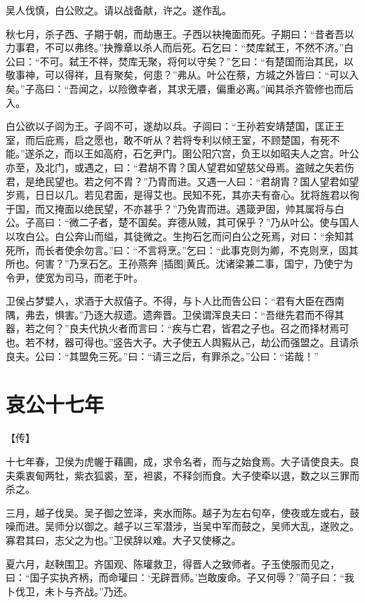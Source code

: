 \documentclass[a4paper,12pt,UTF8,twoside]{ctexbook}
\begin{document}
吴人伐慎，白公败之。请以战备献，许之。遂作乱。

秋七月，杀子西、子期于朝，而劫惠王。子西以袂掩面而死。子期曰：“昔者吾以力事君，不可以弗终。”抉豫章以杀人而后死。石乞曰：“焚库弑王，不然不济。”白公曰：“不可。弑王不祥，焚库无聚，将何以守矣？”乞曰：“有楚国而治其民，以敬事神，可以得祥，且有聚矣，何患？”弗从。叶公在蔡，方城之外皆曰：“可以入矣。”子高曰：“吾闻之，以险徼幸者，其求无餍，偏重必离。”闻其杀齐管修也而后入。

白公欲以子闾为王。子闾不可，遂劫以兵。子闾曰：“王孙若安靖楚国，匡正王室，而后庇焉，启之愿也，敢不听从？若将专利以倾王室，不顾楚国，有死不能。”遂杀之，而以王如高府，石乞尹门。圉公阳穴宫，负王以如昭夫人之宫。叶公亦至，及北门，或遇之，曰：“君胡不胄？国人望君如望慈父母焉。盗贼之矢若伤君，是绝民望也。若之何不胄？”乃胄而进。又遇一人曰：“君胡胄？国人望君如望岁焉，日日以几。若见君面，是得艾也。民知不死，其亦夫有奋心。犹将旌君以徇于国，而又掩面以绝民望，不亦甚乎？”乃免胄而进。遇箴尹固，帅其属将与白公。子高曰：“微二子者，楚不国矣。弃德从贼，其可保乎？”乃从叶公。使与国人以攻白公。白公奔山而缢，其徒微之。生拘石乞而问白公之死焉，对曰：“余知其死所，而长者使余勿言。”曰：“不言将烹。”乞曰：“此事克则为卿，不克则烹，固其所也。何害？”乃烹石乞。王孙燕奔 [插图]黄氏。沈诸梁兼二事，国宁，乃使宁为令尹，使宽为司马，而老于叶。

卫侯占梦嬖人，求酒于大叔僖子。不得，与卜人比而告公曰：“君有大臣在西南隅，弗去，惧害。”乃逐大叔遗。遗奔晋。卫侯谓浑良夫曰：“吾继先君而不得其器，若之何？”良夫代执火者而言曰：“疾与亡君，皆君之子也。召之而择材焉可也。若不材，器可得也。”竖告大子。大子使五人舆豭从己，劫公而强盟之。且请杀良夫。公曰：“其盟免三死。”曰：“请三之后，有罪杀之。”公曰：“诺哉！”


\section{哀公十七年}



【传】

十七年春，卫侯为虎幄于藉圃，成，求令名者，而与之始食焉。大子请使良夫。良夫乘衷甸两牡，紫衣狐裘，至，袒裘，不释剑而食。大子使牵以退，数之以三罪而杀之。

三月，越子伐吴。吴子御之笠泽，夹水而陈。越子为左右句卒，使夜或左或右，鼓噪而进。吴师分以御之。越子以三军潜涉，当吴中军而鼓之，吴师大乱，遂败之。寡君其曰，志父之为也。”卫侯辞以难。大子又使椓之。

夏六月，赵鞅围卫。齐国观、陈瓘救卫，得晋人之致师者。子玉使服而见之，曰：“国子实执齐柄，而命瓘曰：‘无辟晋师。’岂敢废命。子又何辱？”简子曰：“我卜伐卫，未卜与齐战。”乃还。
\end{document}
